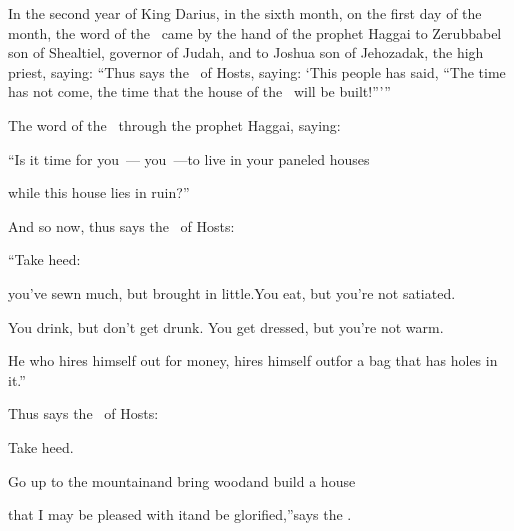 
\begin{inparaenum}
   In the second year of King Darius, in the sixth month, on the first day of the month, the word of the \lord\ came by the hand of the prophet Haggai to Zerubbabel son of Shealtiel, governor of Judah, and to Joshua son of Jehozadak, the high priest, saying:%
   ``Thus says the \lord\ of Hosts, saying: `This people has said, ``The time has not come, the time that the house of the \lord\ will be built!''\thinspace'\thinspace''%

   The word of the \lord\ through the prophet Haggai, saying:\smallskip%

  \pc{} ``Is it time for you~--- you~---\pa{}to live in your paneled houses%

  \pd{}while this house lies in ruin?''%

  \pc{} And so now, thus says the \lord\ of Hosts:%

  \pd{}``Take heed:%

  \pc{} you've sewn much, but brought in little.\pa{}You eat, but you're not satiated.%

  \pd{}You drink, but don't get drunk.%
  \pa{}You get dressed, but you're not warm.%

  \pd{}He who hires himself out for money, hires himself out\pa{}for a bag that has holes in it.''\bigskip%

   Thus says the \lord\ of Hosts:\smallskip%

  \pd{}Take heed.%

  \pc{} Go up to the mountain\pa{}and bring wood\pa{}and build a house%

  \pd{}that I may be pleased with it\pa{}and be glorified,''\pa{}says the \lord.%


\end{inparaenum}
